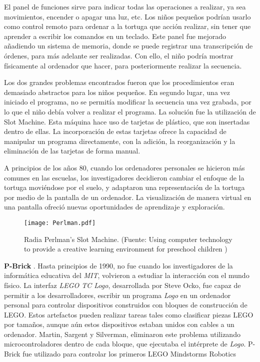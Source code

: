 El panel de funciones sirve para indicar todas las operaciones a realizar, ya sea movimientos, encender o apagar una luz, etc. Los niños pequeños podrían usarlo como control remoto para ordenar a la tortuga que acción realizar, sin tener que aprender a escribir los comandos en un teclado. Este panel fue mejorado añadiendo un sistema de memoria, donde se puede registrar una transcripción de órdenes, para más adelante ser realizadas. Con ello, el niño podría mostrar físicamente al ordenador que hacer, para posteriormente realizar la secuencia.

Los dos grandes problemas encontrados fueron que los procedimientos eran demasiado abstractos para los niños pequeños. En segundo lugar, una vez iniciado el programa, no se permitía modificar la secuencia una vez grabada, por lo que el niño debía volver a realizar el programa. La solución fue la utilización de Slot Machine. Esta máquina hace uso de tarjetas de plástico, que son insertadas dentro de ellas. La incorporación de estas tarjetas ofrece la capacidad de manipular un programa directamente, con la adición, la reorganización y la eliminación de las tarjetas de forma manual.

A principios de los años 80, cuando los ordenadores personales se hicieron más comunes en las escuelas, los investigadores decidieron cambiar el enfoque de la tortuga moviéndose por el suelo, y adaptaron una representación de la tortuga por medio de la pantalla de un ordenador. La visualización de manera virtual en una pantalla ofreció nuevas oportunidades de aprendizaje y exploración.

\begin{figure}[!h]
\begin{center}
\texttt{[image: Perlman.pdf]}
\caption{Radia Perlman’s Slot Machine. (Fuente: Using computer technology to provide a creative learning environment for preschool children  \cite{Perlman})}
\label{fig:Perlman}
\end{center}
\end{figure}

\textbf{P-Brick} \cite{LegoLogo}. Hasta principios de 1990, no fue cuando los investigadores de la informática educativa del \emph{MIT}, volvieron a estudiar la interacción con el mundo físico. La interfaz \emph{LEGO TC Logo}, desarrollada por Steve Ocko, fue capaz de permitir a los desarrolladores, escribir un programa \emph{Logo} en un ordenador personal para controlar dispositivos construidos con bloques de construcción de LEGO. Estos artefactos pueden realizar tareas tales como clasificar piezas LEGO por tamaños, aunque aún estos dispositivos estaban unidos con cables a un ordenador. Martin, Sargent y Silverman, eliminaron este problema utilizando microcontroladores dentro de cada bloque, que ejecutaba el intérprete de \emph{Logo}.
P-Brick fue utilizado para controlar los primeros LEGO Mindstorms Robotics

